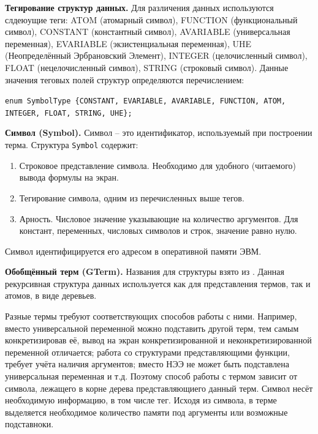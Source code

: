 
\textbf{Тегирование структур данных.} 
Для различения данных используются слдеюущие теги: ATOM (атомарный символ), FUNCTION (функциональный символ), CONSTANT (константный символ), AVARIABLE (универсальная переменная), EVARIABLE (экзистенциальная переменная), UHE (Неопределённый Эрбрановский Элемент), INTEGER (целочисленный символ), FLOAT (нецелочисленный символ), STRING (строковый символ). Данные значения теговых полей структур определяются перечислением:

{\tt enum SymbolType \{CONSTANT, EVARIABLE, AVARIABLE, FUNCTION, ATOM, INTEGER, FLOAT, STRING, UHE\};}

\textbf{Символ (Symbol).} 
Символ -- это идентификатор, используемый при построении терма. Структура \texttt{Symbol} содержит: 
\begin{enumerate}
\item Строковое представление символа. Необходимо для удобного (читаемого) вывода формулы на экран.
\item Тегирование символа, одним из перечисленных выше тегов. 
\item Арность. Числовое значение указывающие на количество аргументов. Для констант, переменных, числовых символов и строк, значение равно нулю.
\end{enumerate}

Символ идентифицируется его адресом в оперативной памяти ЭВМ.

\textbf{Обобщённый терм (GTerm).} 
Названия для структуры взято из \cite{NNN}. Данная рекурсивная структура данных используется как для представления термов, так и атомов, в виде деревьев. 

Разные термы требуют соответствующих способов работы с ними. Например, вместо универсальной переменной можно подставить другой терм, тем самым конкретизировав её, вывод на экран конкретизированной и неконкретизированной переменной отличается; работа со структурами представляющими функции, требует учёта наличия аргументов; вместо НЭЭ не может быть подставлена универсальная переменная и т.д. Поэтому способ работы с термом зависит от символа, лежащего в корне дерева представляющиего данный терм. Символ несёт необходимую информацию, в том числе тег. Исходя из символа, в терме выделяется необходимое количество памяти под аргументы или возможные подставноки.  

